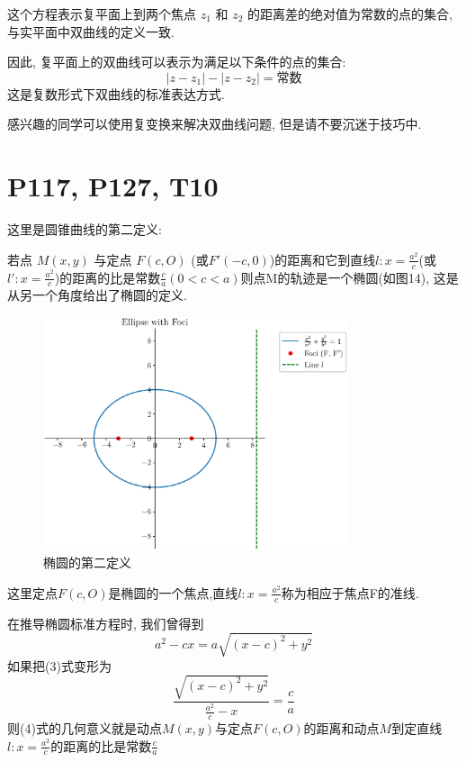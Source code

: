 \documentclass{book}
\begin{document}
    这个方程表示复平面上到两个焦点 \( z_1 \) 和 \( z_2 \) 的距离差的绝对值为常数的点的集合, 与实平面中双曲线的定义一致.

    因此, 复平面上的双曲线可以表示为满足以下条件的点的集合:
    \[
        |z - z_1| - |z - z_2| = \text{常数}
    \]
    这是复数形式下双曲线的标准表达方式. \cite{complex}

    感兴趣的同学可以使用复变换来解决双曲线问题, 但是请不要沉迷于技巧中.

    \section{\textcolor[rgb]{0.11,0.65,0.52}{P117, P127, T10}}

    这里是\textcolor[rgb]{0.38,0.11,0.2}{圆锥曲线的第二定义}:

    若点 $M(x,y)$ 与定点 $F(c,O)$ (或$F'(-c,0)$)的距离和它到直线$\displaystyle l:x=\frac{a^2}{c}$(或$\displaystyle l':x=\frac{a^2}{c}$)的距离的比是常数$\displaystyle \frac{c}{a}(0<c<a)$则点M的轨迹是一个椭圆(如图14), 这是从另一个角度给出了椭圆的定义.

    \begin{figure}[htbp]
        \centering
        \includegraphics[width=0.8\textwidth]{img/ConicSection2Define.eps}
        \caption{椭圆的第二定义}
    \end{figure}

    这里定点$F(c,O)$是椭圆的一个焦点,直线$\displaystyle l:x=\frac{a^2}{c}$称为相应于焦点F的准线.

    在推导椭圆标准方程时, 我们曾得到
    \begin{equation}
        a^2-cx=a\sqrt{(x-c)^2+y^2}
    \end{equation}
    如果把(3)式变形为
    \begin{equation}
        \frac{\sqrt{\left( x-c \right)^2+y^2}}{\displaystyle \frac{a^2}{c}-x}=\frac{c}{a}
    \end{equation}
    则(4)式的几何意义就是动点$M(x,y)$与定点$F(c,O)$的距离和动点$M$到定直线$\displaystyle l:x=\frac{a^2}{c}$的距离的比是常数$\displaystyle \frac{c}{a}$
\end{document}
